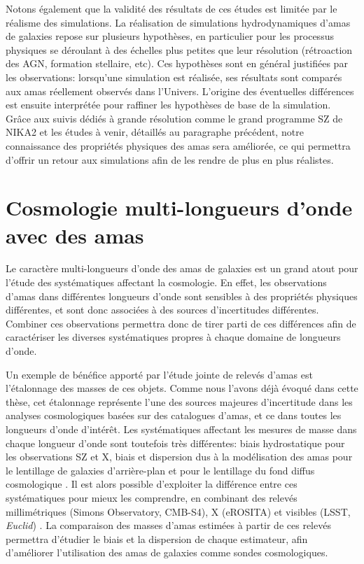 Notons également que la validité des résultats de ces études est limitée par le réalisme des simulations.
La réalisation de simulations hydrodynamiques d'amas de galaxies repose sur plusieurs hypothèses, en particulier pour les processus physiques se déroulant à des échelles plus petites que leur résolution (rétroaction des AGN, formation stellaire, etc).
Ces hypothèses sont en général justifiées par les observations: lorsqu'une simulation est réalisée, ses résultats sont comparés aux amas réellement observés dans l'Univers.
L'origine des éventuelles différences est ensuite interprétée pour raffiner les hypothèses de base de la simulation.
Grâce aux suivis dédiés à grande résolution comme le grand programme SZ de NIKA2 et les études à venir, détaillés au paragraphe précédent, notre connaissance des propriétés physiques des amas sera améliorée, ce qui permettra d'offrir un retour aux simulations afin de les rendre de plus en plus réalistes.

\section*{Cosmologie multi-longueurs d'onde avec des amas}

Le caractère multi-longueurs d'onde des amas de galaxies est un grand atout pour l'étude des systématiques affectant la cosmologie.
En effet, les observations d'amas dans différentes longueurs d'onde sont sensibles à des propriétés physiques différentes, et sont donc associées à des sources d'incertitudes différentes.
Combiner ces observations permettra donc de tirer parti de ces différences afin de caractériser les diverses systématiques propres à chaque domaine de longueurs d'onde.

Un exemple de bénéfice apporté par l'étude jointe de relevés d'amas est l'étalonnage des masses de ces objets.
Comme nous l'avons déjà évoqué dans cette thèse, cet étalonnage représente l'une des sources majeures d'incertitude dans les analyses cosmologiques basées sur des catalogues d'amas, et ce dans toutes les longueurs d'onde d'intérêt.
Les systématiques affectant les mesures de masse dans chaque longueur d'onde sont toutefois très différentes: biais hydrostatique pour les observations SZ et X, biais et dispersion dus à la modélisation des amas pour le lentillage de galaxies d'arrière-plan \cite{grandis_calibration_2021,sommer_weak_2021} et pour le lentillage du fond diffus cosmologique \cite{zubeldia_cosmological_2019}.
Il est alors possible d'exploiter la différence entre ces systématiques pour mieux les comprendre, en combinant des relevés millimétriques (Simons Observatory, CMB-S4), X (eROSITA) et visibles (LSST, \textit{Euclid}) \cite{rhodes_scientific_2017,dodelson_cosmic_2016}.
La comparaison des masses d'amas estimées à partir de ces relevés permettra d'étudier le biais et la dispersion de chaque estimateur, afin d'améliorer l'utilisation des amas de galaxies comme sondes cosmologiques.

